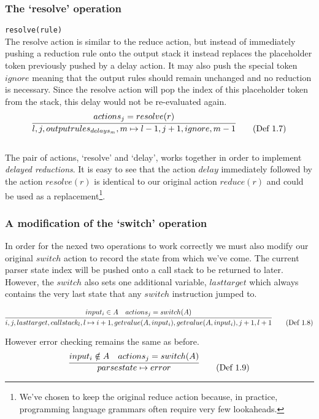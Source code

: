 \documentclass[a4paper,11pt]{article}
\begin{document}
\subsubsection{The `resolve' operation}
\texttt{resolve(rule)}\\
The resolve action is similar to the reduce action, but instead of immediately pushing a reduction rule onto the output stack it instead replaces the placeholder token previously pushed by a delay action.
It may also push the special token $ignore$ meaning that the output rules should remain unchanged and no reduction is necessary. 
Since the resolve action will pop the index of this placeholder token from the stack, this delay would not be re-evaluated again.
\begin{equation}
\infer{l, j, outputrules_{delays_m}, m \mapsto l-1, j+1, ignore, m-1}{actions_j = resolve(r)} \tag{Def 1.7}
\end{equation}\\

The pair of actions, `resolve' and `delay', works together in order to implement \emph{delayed reductions}. 
It is easy to see that the action $delay$ immediately followed by the action $resolve(r)$ is identical to our original action $reduce(r)$ and could be used as a replacement\footnote{We've chosen to keep the original reduce action because, in practice, programming language grammars often require very few lookaheads.}.

\subsubsection{A modification of the `switch' operation}
In order for the nexed two operations to work correctly we must also modify our original $switch$ action to record the state from which we've come.
The current parser state index will be pushed onto a call stack to be returned to later. 
However, the $switch$ also sets one additional variable, $lasttarget$ which always contains the very last state that any $switch$ instruction jumped to.

\begin{equation}
\infer{i, j, lasttarget, callstack_l, l \mapsto i+1, getvalue(A, input_i), getvalue(A, input_i), j+1, l+1}{input_i \in A & actions_j = switch(A)} \tag{Def 1.8}
\end{equation}

However error checking remains the same as before.
\begin{equation}
\infer{parsestate \mapsto error}{input_i \notin A & actions_j = switch(A)} \tag{Def 1.9}
\end{equation}
\end{document}
